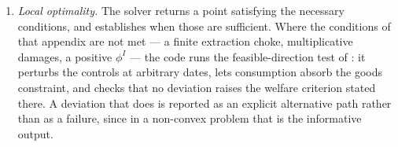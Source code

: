 \begin{enumerate}
\item \emph{Local optimality.} The solver returns a point satisfying the necessary conditions, and  establishes when those are sufficient. Where the conditions of that appendix are not met --- a finite extraction choke, multiplicative damages, a positive $\phi^I$ --- the code runs the feasible-direction test of : it perturbs the controls at arbitrary dates, lets consumption absorb the goods constraint, and checks that no deviation raises the welfare criterion stated there. A deviation that does is reported as an explicit alternative path rather than as a failure, since in a non-convex problem that is the informative output.
\end{enumerate}

